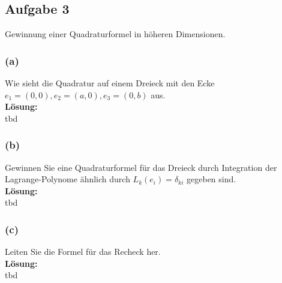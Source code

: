 \documentclass[11pt,a4paper,ngerman]{article}
\begin{document}
\subsection*{Aufgabe 3}

Gewinnung einer Quadraturformel in höheren Dimensionen.

\subsubsection*{(a)}
Wie sieht die Quadratur auf einem Dreieck mit den Ecke $e_1 = (0,0), e_2 = (a,0), e_3 = (0,b)$ aus.\\

\textbf{Lösung:}\\
tbd

\subsubsection*{(b)}
Gewinnen Sie eine Quadraturformel für das Dreieck durch Integration der Lagrange-Polynome ähnlich
durch $L_k(e_i) = \delta_{ki}$ gegeben sind.\\

\textbf{Lösung:}\\
tbd

\subsubsection*{(c)}
Leiten Sie die Formel für das Recheck her.\\

\textbf{Lösung:}\\
tbd


\label{LastPage}
\end{document}
